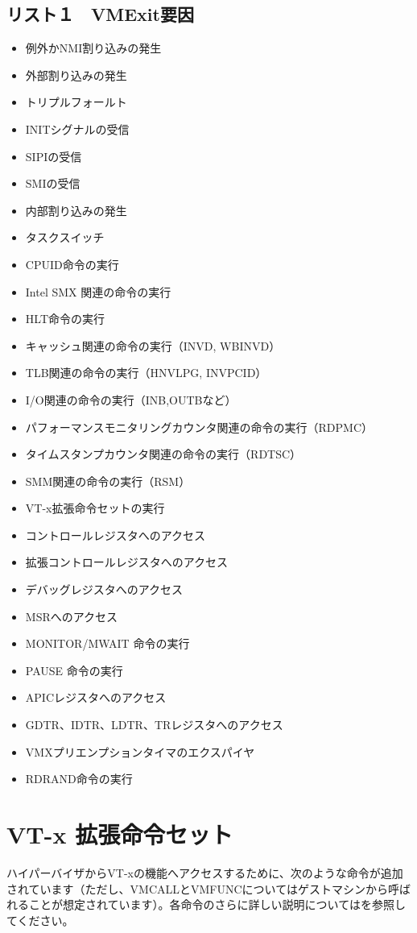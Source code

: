 \subsection*{リスト１　VMExit要因}
\begin{itemize}
 \item 例外かNMI割り込みの発生
 \item 外部割り込みの発生
 \item トリプルフォールト
 \item INITシグナルの受信
 \item SIPIの受信
 \item SMIの受信
 \item 内部割り込みの発生
 \item タスクスイッチ
 \item CPUID命令の実行
 \item Intel SMX 関連の命令の実行
 \item HLT命令の実行
 \item キャッシュ関連の命令の実行（INVD, WBINVD）
 \item TLB関連の命令の実行（HNVLPG, INVPCID）
 \item I/O関連の命令の実行（INB,OUTBなど）
 \item パフォーマンスモニタリングカウンタ関連の命令の実行（RDPMC）
 \item タイムスタンプカウンタ関連の命令の実行（RDTSC）
 \item SMM関連の命令の実行（RSM）
 \item VT-x拡張命令セットの実行
 \item コントロールレジスタへのアクセス
 \item 拡張コントロールレジスタへのアクセス
 \item デバッグレジスタへのアクセス
 \item MSRへのアクセス
 \item MONITOR/MWAIT 命令の実行
 \item PAUSE 命令の実行
 \item APICレジスタへのアクセス
 \item GDTR、IDTR、LDTR、TRレジスタへのアクセス
 \item VMXプリエンプションタイマのエクスパイヤ
 \item RDRAND命令の実行
\end{itemize}

\section{VT-x 拡張命令セット}
ハイパーバイザからVT-xの機能へアクセスするために、次のような命令が追加されています（ただし、VMCALLとVMFUNCについてはゲストマシンから呼ばれることが想定されています）。各命令のさらに詳しい説明については\cite{SDM}を参照してください。


